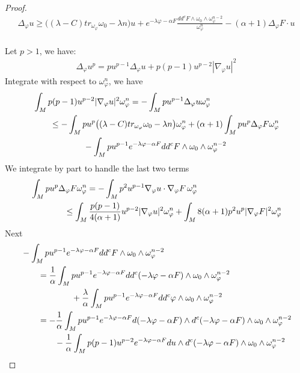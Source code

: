 \documentclass[11pt]{amsart}
\numberwithin{equation}{section}
\begin{document}
\begin{proof}
\begin{align}
	\Delta_\varphi u\ge  \big( (\lambda-C)tr_{\omega_{\varphi}}\omega_0 -\lambda n  \big)u  +e^{-\lambda\varphi-\alpha F}\frac{dd^c F\wedge \omega_0\wedge\omega_\varphi^{n-2}}{\omega_\varphi^n} -  (\alpha+1) \Delta_\varphi F\cdot u
\end{align}\\
Let $p>1$,  we have:
\begin{align}
	\Delta_\varphi u^p = p u^{p-1}\Delta_\varphi u+p(p-1)u^{p-2}|\nabla_\varphi u|^2
\end{align}
Integrate with respect to $\omega_\varphi^n$, we have
\begin{align}
	&\int_M p(p-1)u^{p-2}|\nabla_{\varphi}u|^2\omega_{\varphi}^n = - \int_M pu^{p-1}\Delta_\varphi u \omega_\varphi^n  \notag \\
	&\qquad \le  -\int_M pu^p \big( (\lambda-C)tr_{\omega_{\varphi}}\omega_0-\lambda n\big) \omega_\varphi^n + (\alpha+1) \int_M pu^p \Delta_\varphi F \omega_\varphi^n  \notag\\
	&\quad\quad\quad\quad\qquad - \int_M pu^{p-1} e^{-\lambda\varphi-\alpha F}dd^c F\wedge \omega_0\wedge\omega_\varphi^{n-2}
\end{align}
We integrate by part to handle the last two terms
\begin{align}
	& \int_M pu^p \Delta_\varphi F \omega_\varphi^n = -\int_M p^2 u^{p-1}\nabla_\varphi u \cdot\nabla_\varphi F\,\omega_\varphi^n \notag\\
	&\qquad\qquad  \le  \int_M \frac{p(p-1)}{4(\alpha+1)} u^{p-2}|\nabla_{\varphi}u|^2\omega_{\varphi}^n + \int_M 8(\alpha+1)p^2 u^p |\nabla_\varphi F|^2\omega_\varphi^n
\end{align}
Next 
\begin{align}
	&- \int_M pu^{p-1} e^{-\lambda\varphi-\alpha F}dd^c F\wedge \omega_0\wedge\omega_\varphi^{n-2} \notag\\
	&\qquad = \frac{1}{\alpha} \int_M pu^{p-1} e^{-\lambda\varphi-\alpha F}dd^c(-\lambda\varphi-\alpha F)\wedge \omega_0\wedge\omega_\varphi^{n-2} \notag\\
	&\qquad\qquad\qquad  +\frac{\lambda}{\alpha} \int_M pu^{p-1} e^{-\lambda\varphi-\alpha F}dd^c\varphi \wedge \omega_0\wedge\omega_\varphi^{n-2} \notag\\
	&\qquad = -\frac{1}{\alpha} \int_M pu^{p-1} e^{-\lambda\varphi-\alpha F}d(-\lambda\varphi-\alpha F)\wedge d^c(-\lambda\varphi-\alpha F)\wedge \omega_0 \wedge \omega_\varphi^{n-2} \notag\\
	&\quad\quad\qquad -\frac{1}{\alpha} \int_M p(p-1)u^{p-2} e^{-\lambda\varphi-\alpha F}du\wedge d^c(-\lambda\varphi-\alpha F)\wedge \omega_0\wedge\omega_\varphi^{n-2} \notag\\

\end{align}
\end{proof}
\end{document}
